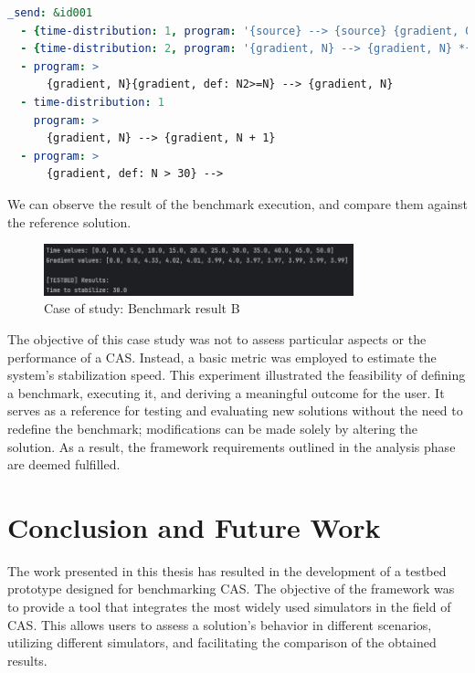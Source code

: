 \documentclass[12pt,a4paper,openright,twoside]{book}
\begin{document}
\begin{lstlisting}[language=yaml, caption={Case of study: benchmark configuration file}]
  _send: &id001
  - {time-distribution: 1, program: '{source} --> {source} {gradient, 0}'}
  - {time-distribution: 2, program: '{gradient, N} --> {gradient, N} *{gradient, N+#D}'}
  - program: >
      {gradient, N}{gradient, def: N2>=N} --> {gradient, N}
  - time-distribution: 1
    program: >
      {gradient, N} --> {gradient, N + 1}
  - program: >
      {gradient, def: N > 30} -->
\end{lstlisting}

We can observe the result of the benchmark execution, and compare them against the reference solution.

\begin{figure}[H]
  \centering
  \includegraphics[width=0.8\textwidth]{figures/result-B.png}
  \caption{Case of study: Benchmark result B}
\end{figure}

The objective of this case study was not to assess particular aspects or the performance of a CAS. 
Instead, a basic metric was employed to estimate the system's stabilization speed.
This experiment illustrated the feasibility of defining a benchmark, executing it, and deriving a meaningful outcome for the user. 
It serves as a reference for testing and evaluating new solutions without the need to redefine the benchmark; modifications can be made solely by altering the solution. 
As a result, the framework requirements outlined in the analysis phase are deemed fulfilled.

\chapter{Conclusion and Future Work}

The work presented in this thesis has resulted in the development of a testbed prototype designed for benchmarking \ac*{CAS}.
The objective of the framework was to provide a tool that integrates the most widely used simulators in the field of \ac*{CAS}.
This allows users to assess a solution's behavior in different scenarios, utilizing different simulators, and facilitating the comparison of the obtained results.
\end{document}
